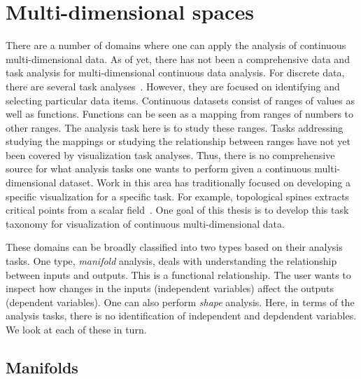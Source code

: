 
\section{Multi-dimensional spaces}
\label{sec:motivation:multi-d}

There are a number of domains where one can apply the analysis of continuous
multi-dimensional data.  As of yet, there has not been a comprehensive data and
task analysis for multi-dimensional continuous data analysis. For discrete
data, there are several task 
analyses~\cite{Shneiderman:1996,Brehmer:2013,Amar:2004}. 
However, they are
focused on identifying and selecting particular data items. Continuous datasets
consist of ranges of values as well as functions. Functions can be seen as a
mapping from ranges of numbers to other ranges. The analysis task here is to
study these ranges.  Tasks addressing studying the mappings or studying the
relationship between ranges have not yet been covered by visualization task
analyses. Thus, there is no comprehensive source for what analysis tasks one
wants to perform given a continuous multi-dimensional dataset.  Work in this
area has traditionally focused on developing a specific visualization for a
specific task. For example, topological spines extracts critical points from a
scalar field~\cite{Correa:2011}. One goal of this thesis is to develop this
task taxonomy for visualization of continuous multi-dimensional data.



These domains can be broadly classified into two types based on their analysis
tasks. One type, \emph{manifold} analysis, deals with understanding the
relationship between inputs and outputs. This is a functional relationship.
The user wants to inspect how changes in the inputs (independent variables)
affect the outputs (dependent variables). One can also perform \emph{shape}
analysis. Here, in terms of the analysis tasks, there is no identification of
independent and depdendent variables. We look at each of these in turn.

\subsection{Manifolds}
\label{sec:manifolds}

